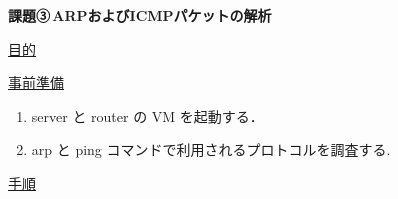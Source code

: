 



% 

\begin{center}

    {\LARGE \bfseries 課題③\,ARPおよびICMPパケットの解析\par}

\end{center}

\vspace{1cm}

{\LARGE \uline{目的}} 

\vspace{1cm}

{\LARGE \uline{事前準備}} 

\begin{enumerate}
    \item server と router の VM を起動する．
    \item arp と ping コマンドで利用されるプロトコルを調査する.
\end{enumerate}

\vspace{1cm}

{\LARGE \uline{手順}} 

